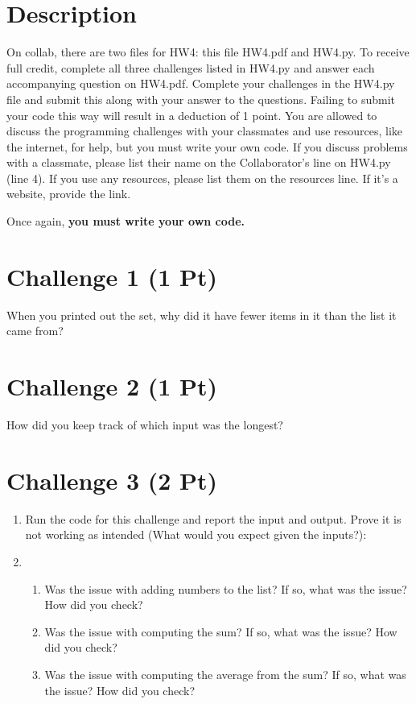 \documentclass{article}
\begin{document}
\pagestyle{fancy}

\section*{Description}
On collab, there are two files for HW4: this file HW4.pdf and HW4.py. To receive full credit,
complete all three challenges listed in HW4.py and answer each accompanying question on HW4.pdf.
Complete your challenges in the HW4.py file and submit this along with your answer to the questions.
Failing to submit your code this way will result in a deduction of 1 point. You are allowed to discuss
the programming challenges with your classmates and use resources, like the internet, for help, but
you must write your own code. If you discuss problems with a classmate, please list their name
on the Collaborator's line on HW4.py (line 4). If you use any resources, please list them on the
resources line. If it's a website, provide the link.

\bigskip

\begin{center}
Once again, \textbf{you must write your own code.}    
\end{center}

\section*{Challenge 1 (1 Pt)}
When you printed out the set, why did it have fewer items in it than the list it came from?
\vspace*{2.5in}

\section*{Challenge 2 (1 Pt)}
How did you keep track of which input was the longest?
\vspace*{2.5in}

\section*{Challenge 3 (2 Pt)}

\begin{enumerate}
    \item Run the code for this challenge and report the input and output. Prove it is not working as intended (What would you expect given the inputs?): \vspace*{2in}
    \item \begin{enumerate}
        \item Was the issue with adding numbers to the list? If so, what was the issue? How did you check? \vspace*{1.75in}
        \item Was the issue with computing the sum? If so, what was the issue? How did you check? \vspace*{1.75in}
        \item Was the issue with computing the average from the sum? If so, what was the issue? How did you check?
    \end{enumerate}
\end{enumerate}
\end{document}
